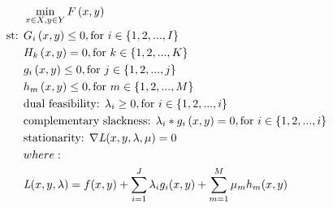 \begin{ceqn}
\begin{align}
&\operatorname*{min}_{x\in X, y\in Y}F\left(x,y\right)\nonumber\\
\text{st:  } & G_i\left(x,y\right)\leq 0, \text{for   }  i \in \{1,2,...,I\}\nonumber\\
& H_k\left(x,y\right)= 0, \text{for   }  k \in \{1,2,...,K\}\nonumber\\
&g_i\left(x,y\right)\leq 0, \text{for   }  j \in \{1,2,...,j\}\nonumber\\
&h_m\left(x,y\right)\leq 0, \text{for   }  m \in \{1,2,...,M\}\nonumber\\
&\text{dual feasibility: }\lambda_i\geq 0, \text{for   }  i \in \{1,2,...,i\}\nonumber\\
&\text{complementary slackness: }\lambda_i*g_i\left(x,y\right)= 0, \text{for   }  i \in \{1,2,...,i\}\nonumber\\ 
&\text{stationarity: }\nabla \textit{L}(x,y,\lambda,\mu)=0\nonumber\\ 
& where:\nonumber\\ 
 &  \textit{L}(x,y,\lambda)=f(x,y)+\sum_{i=1}^{J}\lambda _ig_i(x,y)+\sum_{m=1}^{M}\mu _mh_m(x,y)\nonumber
\end{align}
\end{ceqn}

